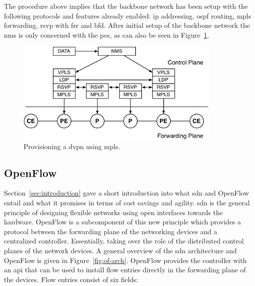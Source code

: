 The procedure above implies that the backbone network has been setup with the following protocols and features already enabled: \ac{ip} addressing, \ac{ospf} routing, \ac{mpls} forwarding, \ac{rsvp} with \ac{frr} and \ac{bfd}. After initial setup of the backbone network the \ac{nms} is only concerned with the \acp{pe}, as can also be seen in Figure~\ref{fig:nms-stack}.

\begin{figure}[!h]
	\centering
	\includegraphics[width=10cm]{./includes/nms-stack.pdf}
	\caption{Provisioning a \ac{dvpn} using \ac{mpls}.}
	\label{fig:nms-stack}
\end{figure}



\subsection{OpenFlow} %
\label{sub:openflow}

Section~\ref{sec:introduction} gave a short introduction into what \ac{sdn} and OpenFlow entail and what it promises in terms of cost savings and agility. \acl{sdn} is the general principle of designing flexible networks using open interfaces towards the hardware. OpenFlow is a subcomponent of this new principle which provides a protocol between the forwarding plane of the networking devices and a centralized controller. Essentially, taking over the role of the distributed control planes of the network devices. A general overview of the \ac{sdn} architecture and OpenFlow is given in Figure~\ref{fig:of-arch}. OpenFlow provides the controller with an \ac{api} that can be used to install flow entries directly in the forwarding plane of the devices. Flow entries consist of six fields:

